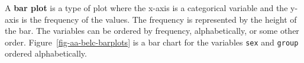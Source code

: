 \documentclass[
  letterpaper,
]{latex/krantz}
\theoremstyle{definition}
\theoremstyle{remark}
\begin{document}
A \textbf{bar plot} is a type of plot where the x-axis is a categorical
variable and the y-axis is the frequency of the values. The frequency is
represented by the height of the bar. The variables can be ordered by
frequency, alphabetically, or some other order.
Figure~\ref{fig-aa-belc-barplots} is a bar chart for the variables
\texttt{sex} and \texttt{group} ordered alphabetically.

\begin{figure}[H]

\begin{minipage}{0.50\linewidth}



\end{minipage}%
%
\begin{minipage}{0.50\linewidth}

\centering{

}
\end{minipage}
\end{figure}
\end{document}
